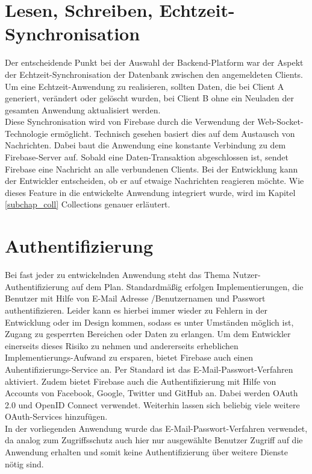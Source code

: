 \section{Lesen, Schreiben, Echtzeit-Synchronisation}
Der entscheidende Punkt bei der Auswahl der Backend-Platform war der Aspekt der Echtzeit-Synchronisation der Datenbank zwischen den angemeldeten Clients.
Um eine Echtzeit-Anwendung zu realisieren, sollten Daten, die bei Client A generiert, verändert oder gelöscht wurden, bei Client B ohne ein Neuladen der gesamten Anwendung aktualisiert werden.\\
Diese Synchronisation wird von Firebase durch die Verwendung der Web-Socket-Technologie ermöglicht. Technisch gesehen basiert dies auf dem Austausch von Nachrichten. Dabei baut die Anwendung eine konstante Verbindung
zu dem Firebase-Server auf. Sobald eine Daten-Transaktion abgeschlossen ist, sendet Firebase eine Nachricht an alle verbundenen Clients. Bei der Entwicklung kann der Entwickler entscheiden, ob er auf etwaige Nachrichten reagieren möchte.
Wie dieses Feature in die entwickelte Anwendung integriert wurde, wird im Kapitel \ref{subchap_coll} Collections genauer erläutert.

\section{Authentifizierung}
\label{chap_auth}
Bei fast jeder zu entwickelnden Anwendung steht das Thema Nutzer-Authentifizierung auf dem Plan. Standardmäßig erfolgen Implementierungen, die Benutzer mit Hilfe von E-Mail Adresse /Benutzernamen und Passwort authentifizieren.
Leider kann es hierbei immer wieder zu Fehlern in der Entwicklung oder im Design kommen, sodass es unter Umständen möglich ist, Zugang zu gesperrten Bereichen oder Daten zu erlangen.
Um dem Entwickler einerseits dieses Risiko zu nehmen und andererseits erheblichen Implementierungs-Aufwand zu ersparen, bietet Firebase auch einen Auhentifizierungs-Service an.
Per Standard ist das E-Mail-Passwort-Verfahren aktiviert. Zudem bietet Firebase auch die Authentifizierung mit Hilfe von Accounts von Facebook, Google, Twitter und GitHub an. Dabei werden OAuth 2.0 und OpenID Connect verwendet. Weiterhin lassen sich
beliebig viele weitere OAuth-Services hinzufügen.\\

In der vorliegenden Anwendung wurde das E-Mail-Passwort-Verfahren verwendet, da analog zum Zugriffsschutz auch hier nur ausgewählte Benutzer Zugriff auf die Anwendung erhalten und somit keine Authentifizierung über weitere Dienste nötig sind.

